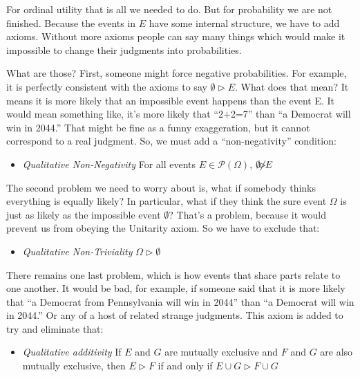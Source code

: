 
For ordinal utility that is all we needed to do. But for probability we are not finished.  Because the events in $E$ have some internal structure, we have to add axioms.  Without more axioms people can say many things which would make it impossible to change their judgments into probabilities.

What are those?  First, someone might force negative probabilities.  For example, it is perfectly consistent with the axioms to say $\emptyset \triangleright E$.  What does that mean?  It means it is more likely that an impossible event happens than the event E. It would mean something like, it's more likely that ``2+2=7'' than ``a Democrat will win in 2044.''  That might be fine as a funny exaggeration, but it cannot correspond to a real judgment.  So, we must add a ``non-negativity'' condition:

\begin{itemize}
    \item {\it Qualitative Non-Negativity} For all events $E \in \mathscr{P}(\Omega)$, $\emptyset \cancel{\triangleright} E$
\end{itemize}

The second problem we need to worry about is, what if somebody thinks everything is equally likely?  In particular, what if they think the sure event $\Omega$ is just as likely as the impossible event $\emptyset$?  That's a problem, because it would prevent us from obeying the Unitarity axiom.  So we have to exclude that:

\begin{itemize}
    \item {\it Qualitative Non-Triviality} $\Omega \triangleright \emptyset$
\end{itemize}

There remains one last problem, which is how events that share parts relate to one another.  It would be bad, for example, if someone said that it is more likely that ``a Democrat from Pennsylvania will win in 2044'' than ``a Democrat will win in 2044.''  Or any of a host of related strange judgments.  This axiom is added to try and eliminate that:

\begin{itemize}
    \item {\it Qualitative additivity} If $E$ and $G$ are mutually exclusive and $F$ and $G$ are also mutually exclusive, then $E \triangleright F$ if and only if $E \cup G \triangleright F \cup G$
\end{itemize}



